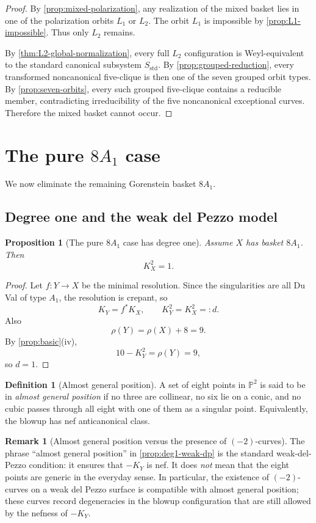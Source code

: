 \documentclass[11pt]{article}
\newtheorem{proposition}[proposition]{Proposition}
\theoremstyle{definition}
\newtheorem{remark}[remark]{Remark}
\newtheorem{definition}[definition]{Definition}
\newcommand{\Pbb}{\mathbb P}
\begin{document}
\begin{proof}
By \cref{prop:mixed-polarization}, any realization of the mixed basket lies in one of the polarization orbits $L_1$ or $L_2$. The orbit $L_1$ is impossible by \cref{prop:L1-impossible}. Thus only $L_2$ remains.

By \cref{thm:L2-global-normalization}, every full $L_2$ configuration is Weyl-equivalent to the standard canonical subsystem $S_{\mathrm{std}}$. By \cref{prop:grouped-reduction}, every transformed noncanonical five-clique is then one of the seven grouped orbit types. By \cref{prop:seven-orbits}, every such grouped five-clique contains a reducible member, contradicting irreducibility of the five noncanonical exceptional curves. Therefore the mixed basket cannot occur.
\end{proof}

\section{The pure \texorpdfstring{$8A_1$}{8A1} case}\label{sec:pure8a1}
We now eliminate the remaining Gorenstein basket $8A_1$.

\subsection{Degree one and the weak del Pezzo model}

\begin{proposition}[The pure $8A_1$ case has degree one]\label{prop:8a1-degree-one}
Assume $X$ has basket $8A_1$. Then
\[
K_X^2=1.
\]
\end{proposition}

\begin{proof}
Let $f\colon Y\to X$ be the minimal resolution. Since the singularities are all Du Val of type $A_1$, the resolution is crepant, so
\[
K_Y=f^*K_X,
\qquad
K_Y^2=K_X^2=:d.
\]
Also
\[
\rho(Y)=\rho(X)+8=9.
\]
By \cref{prop:basic}(iv),
\[
10-K_Y^2=\rho(Y)=9,
\]
so $d=1$.
\end{proof}

\begin{definition}[Almost general position]
A set of eight points in $\Pbb^2$ is said to be in \emph{almost general position} if no three are collinear, no six lie on a conic, and no cubic passes through all eight with one of them as a singular point. Equivalently, the blowup has nef anticanonical class.
\end{definition}

\begin{remark}[Almost general position versus the presence of $(-2)$-curves]
The phrase ``almost general position'' in \cref{prop:deg1-weak-dp} is the standard weak-del-Pezzo condition: it ensures that $-K_Y$ is nef. It does \emph{not} mean that the eight points are generic in the everyday sense. In particular, the existence of $(-2)$-curves on a weak del Pezzo surface is compatible with almost general position; these curves record degeneracies in the blowup configuration that are still allowed by the nefness of $-K_Y$.
\end{remark}
\end{document}
